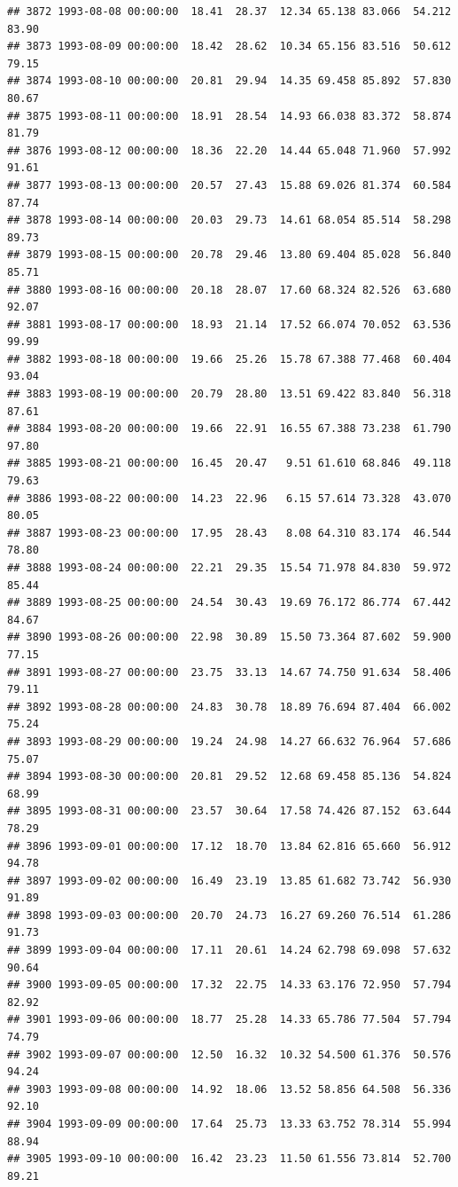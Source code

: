 \documentclass{article}\usepackage{graphicx, color}
\makeatletter
\newenvironment{kframe}{%
 \def\at@end@of@kframe{}%
 \ifinner\ifhmode%
  \def\at@end@of@kframe{\end{minipage}}%
  \begin{minipage}{\columnwidth}%
 \fi\fi%
 \def\FrameCommand##1{\hskip\@totalleftmargin \hskip-\fboxsep
 \colorbox{shadecolor}{##1}\hskip-\fboxsep
     \hskip-\linewidth \hskip-\@totalleftmargin \hskip\columnwidth}%
 \MakeFramed {\advance\hsize-\width
   \@totalleftmargin\z@ \linewidth\hsize
   \@setminipage}}%
 {\par\unskip\endMakeFramed%
 \at@end@of@kframe}
\newenvironment{knitrout}{}{} %
\makeatother
\begin{document}
\begin{knitrout}
\begin{kframe}
\begin{verbatim}
## 3872 1993-08-08 00:00:00  18.41  28.37  12.34 65.138 83.066  54.212  83.90
## 3873 1993-08-09 00:00:00  18.42  28.62  10.34 65.156 83.516  50.612  79.15
## 3874 1993-08-10 00:00:00  20.81  29.94  14.35 69.458 85.892  57.830  80.67
## 3875 1993-08-11 00:00:00  18.91  28.54  14.93 66.038 83.372  58.874  81.79
## 3876 1993-08-12 00:00:00  18.36  22.20  14.44 65.048 71.960  57.992  91.61
## 3877 1993-08-13 00:00:00  20.57  27.43  15.88 69.026 81.374  60.584  87.74
## 3878 1993-08-14 00:00:00  20.03  29.73  14.61 68.054 85.514  58.298  89.73
## 3879 1993-08-15 00:00:00  20.78  29.46  13.80 69.404 85.028  56.840  85.71
## 3880 1993-08-16 00:00:00  20.18  28.07  17.60 68.324 82.526  63.680  92.07
## 3881 1993-08-17 00:00:00  18.93  21.14  17.52 66.074 70.052  63.536  99.99
## 3882 1993-08-18 00:00:00  19.66  25.26  15.78 67.388 77.468  60.404  93.04
## 3883 1993-08-19 00:00:00  20.79  28.80  13.51 69.422 83.840  56.318  87.61
## 3884 1993-08-20 00:00:00  19.66  22.91  16.55 67.388 73.238  61.790  97.80
## 3885 1993-08-21 00:00:00  16.45  20.47   9.51 61.610 68.846  49.118  79.63
## 3886 1993-08-22 00:00:00  14.23  22.96   6.15 57.614 73.328  43.070  80.05
## 3887 1993-08-23 00:00:00  17.95  28.43   8.08 64.310 83.174  46.544  78.80
## 3888 1993-08-24 00:00:00  22.21  29.35  15.54 71.978 84.830  59.972  85.44
## 3889 1993-08-25 00:00:00  24.54  30.43  19.69 76.172 86.774  67.442  84.67
## 3890 1993-08-26 00:00:00  22.98  30.89  15.50 73.364 87.602  59.900  77.15
## 3891 1993-08-27 00:00:00  23.75  33.13  14.67 74.750 91.634  58.406  79.11
## 3892 1993-08-28 00:00:00  24.83  30.78  18.89 76.694 87.404  66.002  75.24
## 3893 1993-08-29 00:00:00  19.24  24.98  14.27 66.632 76.964  57.686  75.07
## 3894 1993-08-30 00:00:00  20.81  29.52  12.68 69.458 85.136  54.824  68.99
## 3895 1993-08-31 00:00:00  23.57  30.64  17.58 74.426 87.152  63.644  78.29
## 3896 1993-09-01 00:00:00  17.12  18.70  13.84 62.816 65.660  56.912  94.78
## 3897 1993-09-02 00:00:00  16.49  23.19  13.85 61.682 73.742  56.930  91.89
## 3898 1993-09-03 00:00:00  20.70  24.73  16.27 69.260 76.514  61.286  91.73
## 3899 1993-09-04 00:00:00  17.11  20.61  14.24 62.798 69.098  57.632  90.64
## 3900 1993-09-05 00:00:00  17.32  22.75  14.33 63.176 72.950  57.794  82.92
## 3901 1993-09-06 00:00:00  18.77  25.28  14.33 65.786 77.504  57.794  74.79
## 3902 1993-09-07 00:00:00  12.50  16.32  10.32 54.500 61.376  50.576  94.24
## 3903 1993-09-08 00:00:00  14.92  18.06  13.52 58.856 64.508  56.336  92.10
## 3904 1993-09-09 00:00:00  17.64  25.73  13.33 63.752 78.314  55.994  88.94
## 3905 1993-09-10 00:00:00  16.42  23.23  11.50 61.556 73.814  52.700  89.21

\end{verbatim}
\end{kframe}
\end{knitrout}
\end{document}
